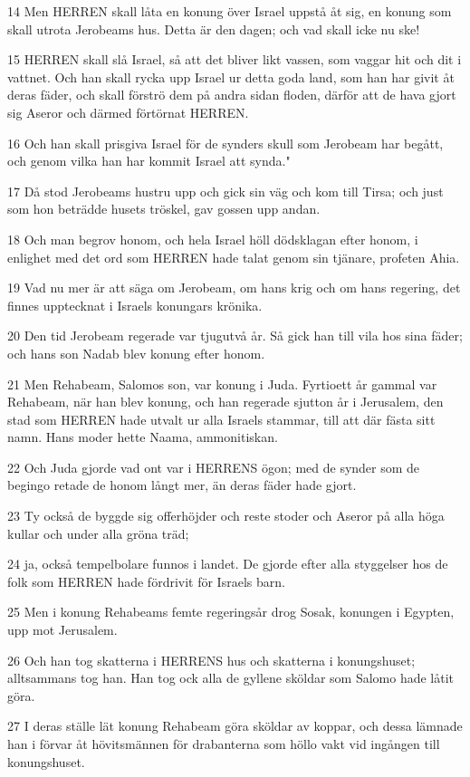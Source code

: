 \par 14 Men HERREN skall låta en konung över Israel uppstå åt sig, en konung som skall utrota Jerobeams hus. Detta är den dagen; och vad skall icke nu ske!
\par 15 HERREN skall slå Israel, så att det bliver likt vassen, som vaggar hit och dit i vattnet. Och han skall rycka upp Israel ur detta goda land, som han har givit åt deras fäder, och skall förströ dem på andra sidan floden, därför att de hava gjort sig Aseror och därmed förtörnat HERREN.
\par 16 Och han skall prisgiva Israel för de synders skull som Jerobeam har begått, och genom vilka han har kommit Israel att synda."
\par 17 Då stod Jerobeams hustru upp och gick sin väg och kom till Tirsa; och just som hon beträdde husets tröskel, gav gossen upp andan.
\par 18 Och man begrov honom, och hela Israel höll dödsklagan efter honom, i enlighet med det ord som HERREN hade talat genom sin tjänare, profeten Ahia.
\par 19 Vad nu mer är att säga om Jerobeam, om hans krig och om hans regering, det finnes upptecknat i Israels konungars krönika.
\par 20 Den tid Jerobeam regerade var tjugutvå år. Så gick han till vila hos sina fäder; och hans son Nadab blev konung efter honom.
\par 21 Men Rehabeam, Salomos son, var konung i Juda. Fyrtioett år gammal var Rehabeam, när han blev konung, och han regerade sjutton år i Jerusalem, den stad som HERREN hade utvalt ur alla Israels stammar, till att där fästa sitt namn. Hans moder hette Naama, ammonitiskan.
\par 22 Och Juda gjorde vad ont var i HERRENS ögon; med de synder som de begingo retade de honom långt mer, än deras fäder hade gjort.
\par 23 Ty också de byggde sig offerhöjder och reste stoder och Aseror på alla höga kullar och under alla gröna träd;
\par 24 ja, också tempelbolare funnos i landet. De gjorde efter alla styggelser hos de folk som HERREN hade fördrivit för Israels barn.
\par 25 Men i konung Rehabeams femte regeringsår drog Sosak, konungen i Egypten, upp mot Jerusalem.
\par 26 Och han tog skatterna i HERRENS hus och skatterna i konungshuset; alltsammans tog han. Han tog ock alla de gyllene sköldar som Salomo hade låtit göra.
\par 27 I deras ställe lät konung Rehabeam göra sköldar av koppar, och dessa lämnade han i förvar åt hövitsmännen för drabanterna som höllo vakt vid ingången till konungshuset.
